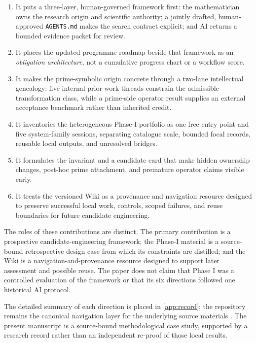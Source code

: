 \begin{enumerate}
  \item It puts a three-layer, human-governed framework first: the
  mathematician owns the research origin and scientific authority; a jointly
  drafted, human-approved \texttt{AGENTS.md} makes the search contract
  explicit; and AI returns a bounded evidence packet for review.
  \item It places the updated programme roadmap beside that framework as an
  \emph{obligation architecture}, not a cumulative progress chart or a
  workflow score.
  \item It makes the prime-symbolic origin concrete through a two-lane
  intellectual genealogy: five internal prior-work threads constrain the
  admissible transformation class, while a prime-side operator result supplies
  an external acceptance benchmark rather than inherited credit.
  \item It inventories the heterogeneous Phase-I portfolio as one free entry
  point and five system-family sessions, separating catalogue scale, bounded
  focal records, reusable local outputs, and unresolved bridges.
  \item It formulates the \sameobject{} invariant and a candidate card that
  make hidden ownership changes, post-hoc prime attachment, and premature
  operator claims visible early.
  \item It treats the versioned Wiki as a provenance and navigation resource
  designed to preserve successful local work, controls, scoped failures, and
  reuse boundaries for future candidate engineering.
\end{enumerate}

The roles of these contributions are distinct. The primary contribution is a
prospective candidate-engineering framework; the Phase-I material is a
source-bound retrospective design case from which its constraints are
distilled; and the Wiki is a navigation-and-provenance resource designed to
support later assessment and possible reuse. The paper does not claim that
Phase I was a controlled evaluation of the framework or that its six directions
followed one historical AI protocol.

The detailed summary of each direction is placed in \cref{app:record}; the
repository remains the canonical navigation layer for the underlying source
materials \citep{PhaseIRepository}. The present manuscript is a source-bound
methodological case study, supported by a research record rather than an
independent re-proof of those local results.

